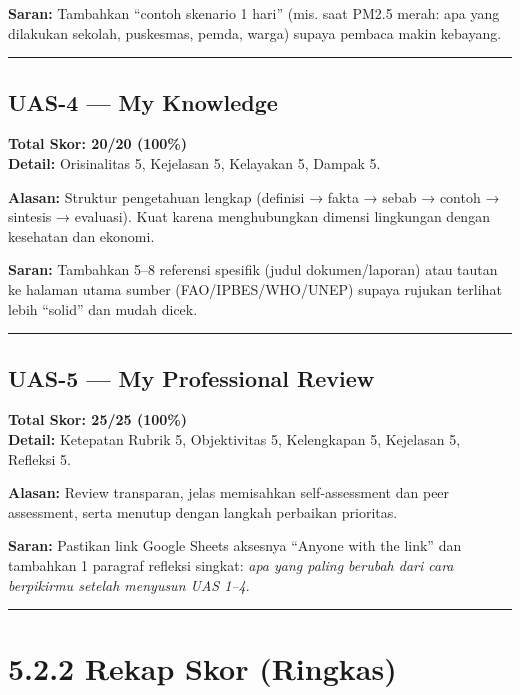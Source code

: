 \documentclass[
  letterpaper,
  DIV=11,
  numbers=noendperiod]{scrreprt}
\begin{document}
\textbf{Saran:} Tambahkan ``contoh skenario 1 hari'' (mis. saat PM2.5
merah: apa yang dilakukan sekolah, puskesmas, pemda, warga) supaya
pembaca makin kebayang.

\begin{center}\rule{0.5\linewidth}{0.5pt}\end{center}

\subsection{UAS-4 --- My Knowledge}\label{uas-4-my-knowledge-1}

\textbf{Total Skor: 20/20 (100\%)}\\
\textbf{Detail:} Orisinalitas 5, Kejelasan 5, Kelayakan 5, Dampak 5.

\textbf{Alasan:} Struktur pengetahuan lengkap (definisi → fakta → sebab
→ contoh → sintesis → evaluasi). Kuat karena menghubungkan dimensi
lingkungan dengan kesehatan dan ekonomi.

\textbf{Saran:} Tambahkan 5--8 referensi spesifik (judul
dokumen/laporan) atau tautan ke halaman utama sumber
(FAO/IPBES/WHO/UNEP) supaya rujukan terlihat lebih ``solid'' dan mudah
dicek.

\begin{center}\rule{0.5\linewidth}{0.5pt}\end{center}

\subsection{UAS-5 --- My Professional
Review}\label{uas-5-my-professional-review}

\textbf{Total Skor: 25/25 (100\%)}\\
\textbf{Detail:} Ketepatan Rubrik 5, Objektivitas 5, Kelengkapan 5,
Kejelasan 5, Refleksi 5.

\textbf{Alasan:} Review transparan, jelas memisahkan self-assessment dan
peer assessment, serta menutup dengan langkah perbaikan prioritas.

\textbf{Saran:} Pastikan link Google Sheets aksesnya ``Anyone with the
link'' dan tambahkan 1 paragraf refleksi singkat: \emph{apa yang paling
berubah dari cara berpikirmu setelah menyusun UAS 1--4}.

\begin{center}\rule{0.5\linewidth}{0.5pt}\end{center}

\section{5.2.2 Rekap Skor (Ringkas)}\label{rekap-skor-ringkas-1}
\end{document}
